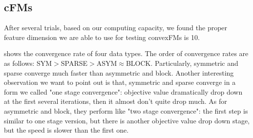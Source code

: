 \documentclass{article}
\begin{document}
\subsection{cFMs} \label{sec:result_cfm}

After several trials, based on our computing capacity, we found the proper feature dimension we are able to use for testing convexFMs is 10.

 shows the convergence rate of four data types. The order of convergence rates are as follows: SYM$>$SPARSE$>$ASYM$\approx$BLOCK. Particularly, symmetric and sparse converge much faster than asymmetric and block. Another interesting observation we want to point out is that, symmetric and sparse converge in a form we called "one stage convergence": objective value dramatically drop down at the first several iterations, then it almost don't quite drop much. As for asymmetric and block, they perform like "two stage convergence": the first step is similar to one stage version, but there is another objective value drop down stage, but the speed is slower than the first one.
\end{document}
